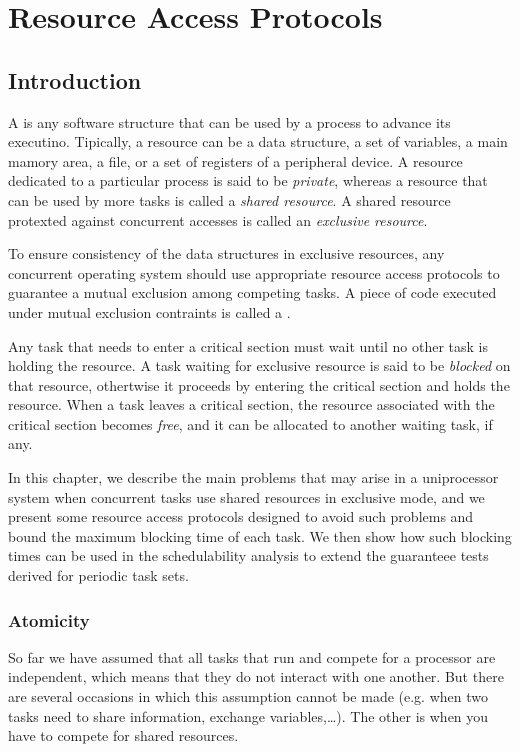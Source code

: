 \chapter{Resource Access Protocols}
\section{Introduction}
A  is any software structure that can be used by a process to advance its executino. Tipically,  a resource can be a data structure, a set of variables, a main mamory area, a file, or a set of registers of a peripheral device. A resource dedicated to a particular process is said to be \textit{private}, whereas a resource that can be used by more tasks is called a \textit{shared resource}. A shared resource protexted against concurrent accesses is called an \textit{exclusive resource}.

To ensure consistency of the data structures in exclusive resources, any concurrent operating system should use appropriate resource access protocols to guarantee a mutual exclusion among competing tasks. A piece of code executed under mutual exclusion contraints is called a .

Any task that needs to enter a critical section must wait until no other task is holding the resource. A task waiting for exclusive resource is said to be \textit{blocked} on that resource, othertwise it proceeds by entering the critical section and holds the resource. When a task leaves a critical section, the resource associated with the critical section becomes \textit{free}, and it can be allocated to another waiting task, if any.

In this chapter, we describe the main problems that may arise in a uniprocessor system when concurrent tasks use shared resources in exclusive mode, and we present some resource access protocols designed to avoid such problems and bound the maximum blocking time of each task. We then show how such blocking times can be used in the schedulability analysis to extend the guaranteee tests derived for periodic task sets.

\subsection{Atomicity}
So far we have assumed that all tasks that run and compete for a processor are independent, which means that they do not interact with one another. But there are several occasions in which this assumption cannot be made (e.g. when two tasks need to share information, exchange variables,\dots).
The other is when you have to compete for shared resources.

